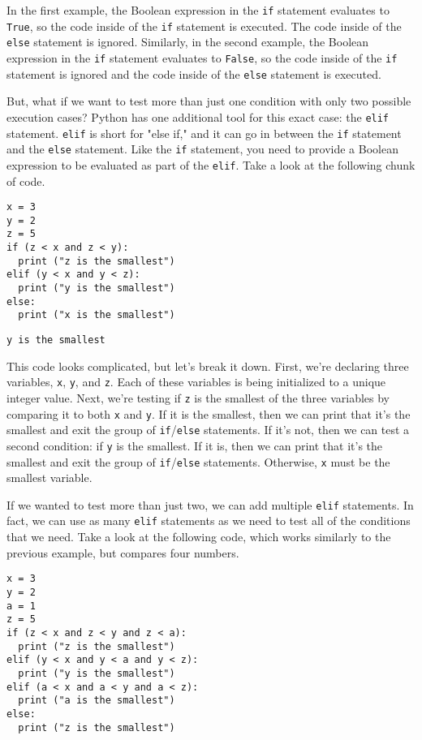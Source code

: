 In the first example, the Boolean expression in the \verb|if| statement evaluates to \verb|True|, so the code inside of the \verb|if| statement is executed. The code inside of the \verb|else| statement is ignored. Similarly, in the second example, the Boolean expression in the \verb|if| statement evaluates to \verb|False|, so the code inside of the \verb|if| statement is ignored and the code inside of the \verb|else| statement is executed.\par
But, what if we want to test more than just one condition with only two possible execution cases? Python has one additional tool for this exact case: the \verb|elif| statement. \verb|elif| is short for "else if," and it can go in between the \verb|if| statement and the \verb|else| statement. Like the \verb|if| statement, you need to provide a Boolean expression to be evaluated as part of the \verb|elif|. Take a look at the following chunk of code.\par
\begin{lstlisting}[style=pippython]
x = 3
y = 2
z = 5
if (z < x and z < y):
  print ("z is the smallest")
elif (y < x and y < z):
  print ("y is the smallest")
else:
  print ("x is the smallest")
\end{lstlisting}
\begin{lstlisting}
y is the smallest
\end{lstlisting}
This code looks complicated, but let's break it down. First, we're declaring three variables, \verb|x|, \verb|y|, and \verb|z|. Each of these variables is being initialized to a unique integer value. Next, we're testing if \verb|z| is the smallest of the three variables by comparing it to both \verb|x| and \verb|y|. If it is the smallest, then we can print that it's the smallest and exit the group of \verb|if|/\verb|else| statements. If it's not, then we can test a second condition: if \verb|y| is the smallest. If it is, then we can print that it's the smallest and exit the group of \verb|if|/\verb|else| statements. Otherwise, \verb|x| must be the smallest variable.\par
If we wanted to test more than just two, we can add multiple \verb|elif| statements. In fact, we can use as many \verb|elif| statements as we need to test all of the conditions that we need. Take a look at the following code, which works similarly to the previous example, but compares four numbers.\par
\begin{lstlisting}[style=pippython]
x = 3
y = 2
a = 1
z = 5
if (z < x and z < y and z < a):
  print ("z is the smallest")
elif (y < x and y < a and y < z):
  print ("y is the smallest")
elif (a < x and a < y and a < z):
  print ("a is the smallest")
else:
  print ("z is the smallest")
\end{lstlisting}
